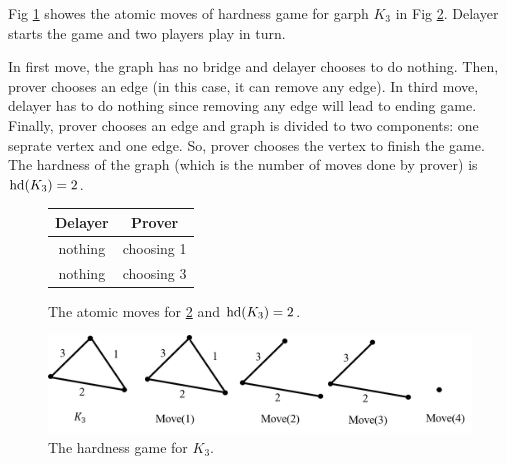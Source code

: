 \documentclass[12pt]{book}
\begin{document}
\begin{examp}\label{exp:hd1}
       Fig \ref{fig:game1} showes the atomic moves of hardness game for garph $K_3$ in Fig \ref{fig:hd1}. Delayer starts the game and two 
	   players play in turn. 
	   
	   In first move, the graph has no bridge and delayer chooses to do nothing. Then, prover chooses an edge (in this case, it can 
	   remove any edge). In third move, delayer has to do nothing since removing any edge will lead to ending game. Finally, prover 
	   chooses an edge and graph is divided to two components: one seprate vertex and one edge. So, prover chooses the vertex to 
	   finish the game. The hardness of the graph (which is the number of moves done by prover) is $\operatorname{hd}(K_3)=2$.
	   
	   \begin{figure}[h]
       \centering
       \begin{tabular}{|c|c|} 
                  \hline
                  Delayer & Prover \\ \hline
                  nothing & choosing 1  \\ \hline
                  nothing & choosing 3  \\ \hline
       \end{tabular}
       \caption{The atomic moves for \ref{fig:hd1} and $\operatorname{hd}(K_3)=2$.}
       \label{fig:game1}
      \end{figure}
	  \begin{figure}
      \begin{center}
      \includegraphics[scale =0.6]{g1.png}
      \caption{The hardness game for $K_3$.}
	  \label{fig:hd1}
      \end{center}
      \end{figure}
\end{examp}
\end{document}
